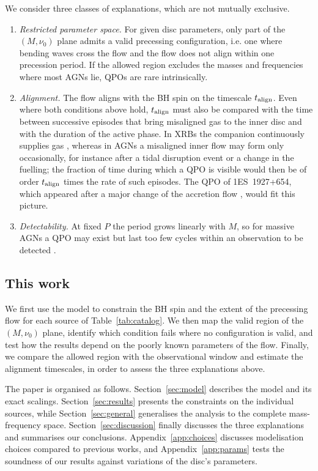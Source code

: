 We consider three classes of explanations, which are not mutually exclusive.
\begin{enumerate}
    \item \textit{Restricted parameter space.}
    For given disc parameters, only part of the $(M,\nu_0)$ plane admits a valid precessing configuration, i.e. one where bending waves cross the flow and the flow does not align within one precession period.
    If the allowed region excludes the masses and frequencies where most AGNs lie, QPOs are rare intrinsically.
    \item \textit{Alignment.}
    The flow aligns with the BH spin on the timescale $t_\textup{align}$.
    Even where both conditions above hold, $t_\textup{align}$ must also be compared with the time between successive episodes that bring misaligned gas to the inner disc and with the duration of the active phase.
    In XRBs the companion continuously supplies gas \citep{Maccarone2002, Martin2008}, whereas in AGNs a misaligned inner flow may form only occasionally, for instance after a tidal disruption event or a change in the fuelling; the fraction of time during which a QPO is visible would then be of order $t_\textup{align}$ times the rate of such episodes.
    The QPO of 1ES~1927+654, which appeared after a major change of the accretion flow \citep{Masterson2025}, would fit this picture.
    \item \textit{Detectability.}
    At fixed $P$ the period grows linearly with $M$, so for massive AGNs a QPO may exist but last too few cycles within an observation to be detected \citep{VaughanUttley2005}.
\end{enumerate}

\subsection{This work}
We first use the model to constrain the BH spin and the extent of the precessing flow for each source of Table~\ref{tab:catalog}.
We then map the valid region of the $(M,\nu_0)$ plane, identify which condition fails where no configuration is valid, and test how the results depend on the poorly known parameters of the flow.
Finally, we compare the allowed region with the observational window and estimate the alignment timescales, in order to assess the three explanations above.

The paper is organised as follows.
Section~\ref{sec:model} describes the model and its exact scalings.
Section~\ref{sec:results} presents the constraints on the individual sources, while Section~\ref{sec:general} generalises the analysis to the complete mass-frequency space.
Section~\ref{sec:discussion} finally discusses the three explanations and summarises our conclusions.
Appendix~\ref{app:choices} discusses modelisation choices compared to previous works, and Appendix~\ref{app:params} tests the soundness of our results against variations of the disc's parameters.